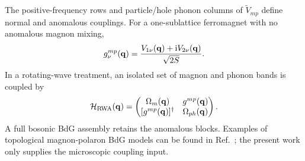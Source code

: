 The positive-frequency rows and particle/hole phonon columns of $\widetilde V_{mp}$ define normal and anomalous couplings. For a one-sublattice ferromagnet with no anomalous magnon mixing,
\begin{equation}
g^{mp}_\nu(\mathbf q)
=\frac{V_{1\nu}(\mathbf q)+\mathrm{i} V_{2\nu}(\mathbf q)}{\sqrt{2S}}.
\label{eq:fm-circular}
\end{equation}
In a rotating-wave treatment, an isolated set of magnon and phonon bands is coupled by
\begin{equation}
\mathcal H_{\rm RWA}(\qq)=
\begin{pmatrix}
\Omega_m(\qq) & g^{mp}(\qq)\\
[g^{mp}(\qq)]^\dagger & \Omega_{ph}(\qq)
\end{pmatrix}.
\label{eq:rwa}
\end{equation}
A full bosonic BdG assembly retains the anomalous blocks. Examples of topological magnon-polaron BdG models can be found in Ref.~\cite{Klogetvedt2023}; the present work only supplies the microscopic coupling input.
